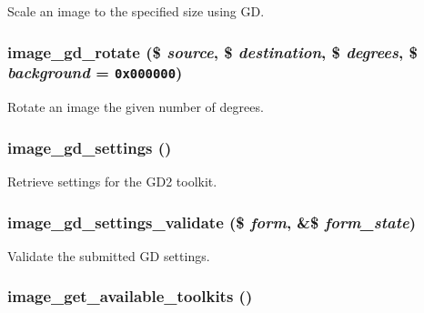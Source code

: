 Scale an image to the specified size using GD. \hypertarget{group__image_gce49547cf14336f64e2fdeb47c8ce440}{
\subsubsection[{image\_\-gd\_\-rotate}]{\setlength{\rightskip}{0pt plus 5cm}image\_\-gd\_\-rotate (\$ {\em source}, \/  \$ {\em destination}, \/  \$ {\em degrees}, \/  \$ {\em background} = {\tt 0x000000})}}
\label{group__image_gce49547cf14336f64e2fdeb47c8ce440}


Rotate an image the given number of degrees. \hypertarget{group__image_g2a492c31e41c59af2b7e976e28886b15}{
\subsubsection[{image\_\-gd\_\-settings}]{\setlength{\rightskip}{0pt plus 5cm}image\_\-gd\_\-settings ()}}
\label{group__image_g2a492c31e41c59af2b7e976e28886b15}


Retrieve settings for the GD2 toolkit. \hypertarget{group__image_gab4f4ec4e8bc9abc51939a4194848fbb}{
\subsubsection[{image\_\-gd\_\-settings\_\-validate}]{\setlength{\rightskip}{0pt plus 5cm}image\_\-gd\_\-settings\_\-validate (\$ {\em form}, \/  \&\$ {\em form\_\-state})}}
\label{group__image_gab4f4ec4e8bc9abc51939a4194848fbb}


Validate the submitted GD settings. \hypertarget{group__image_g190b9b90f931916a5766ed11c29b9326}{
\subsubsection[{image\_\-get\_\-available\_\-toolkits}]{\setlength{\rightskip}{0pt plus 5cm}image\_\-get\_\-available\_\-toolkits ()}}
\label{group__image_g190b9b90f931916a5766ed11c29b9326}


